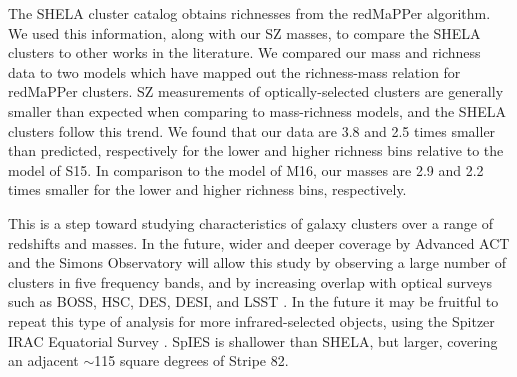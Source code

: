 \documentclass[a4paper,fleqn,usenatbib]{mnras}
\begin{document}

The SHELA cluster catalog obtains richnesses from the redMaPPer algorithm. We used this information, along with our SZ masses, to compare the SHELA clusters to other works in the literature. 
We compared our mass and richness data to two models which have mapped out the richness-mass relation for redMaPPer clusters. SZ measurements of optically-selected clusters are generally smaller than expected when comparing to mass-richness models, and the SHELA clusters follow this trend. We found that our data are 3.8 and 2.5 times smaller than predicted, respectively for the lower and higher richness bins relative to the model of S15. In comparison to the model of M16, our masses are 2.9 and 2.2 times smaller for the lower and higher richness bins, respectively.

This is a step toward studying characteristics of galaxy clusters over a range of redshifts and masses. In the future, wider and deeper coverage by Advanced ACT and the Simons Observatory will allow this study by observing a large number of clusters in five frequency bands, and by increasing overlap with optical surveys such as BOSS, HSC, DES, DESI, and LSST \citep{2016SPIE.9910E..14D}. In the future it may be fruitful to repeat this type of analysis for more infrared-selected objects, using the Spitzer IRAC Equatorial Survey \citep[SpIES,][]{2016ApJS..225....1T}. SpIES is shallower than SHELA, but larger, covering an adjacent $\sim$115 square degrees of Stripe 82.
\end{document}
